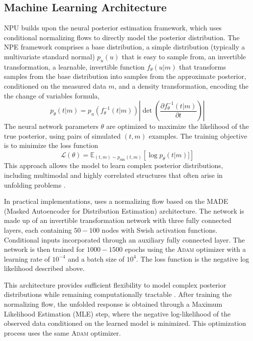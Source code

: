\subsection{Machine Learning Architecture}
    NPU builds upon the neural posterior estimation framework, which uses conditional normalizing flows to directly model the posterior distribution.
    The NPE framework comprises a base distribution, a simple distribution (typically a multivariate standard normal) $p_u(u)$ that is easy to sample from,
    an invertible transformation, a learnable, invertible function $f_\theta(u|m)$ that transforms samples from the base distribution into samples from the approximate posterior, conditioned on the measured data $m$, and
    a density transformation, encoding the the change of variables formula,
    \[
        p_\theta(t|m) = p_u(f_\theta^{-1}(t|m)) \left|\det\left(\frac{\partial f_\theta^{-1}(t|m)}{\partial t}\right)\right|
    \]
    The neural network parameters $\theta$ are optimized to maximize the likelihood of the true posterior, using pairs of simulated $(t, m)$ examples.
    The training objective is to minimize the loss function
    \[
        \mathcal{L}(\theta) = \mathbb{E}_{(t,m) \sim p_{\text{sim}}(t,m)} \left[ \log p_\theta(t|m)]\right]
    \]
    This approach allows the model to learn complex posterior distributions, including multimodal and highly correlated structures that often arise in unfolding problems .

    In practical implementations, uses a normalizing flow based on the MADE (Masked Autoencoder for Distribution Estimation) architecture.
    The network is made up of an invertible transformation network with three fully connected layers, each containing \(50-100\) nodes with Swish activation functions.
    Conditional inputs incorporated through an auxiliary fully connected layer.
    The network is then trained for \(1000-1500\) epochs using the \textsc{Adam} optimizer with a learning rate of \(10^{-4}\) and a batch size of \(10^4\).
    The loss function is the negative log likelihood described above.
    
    This architecture provides sufficient flexibility to model complex posterior distributions while remaining computationally tractable .
    After training the normalizing flow, the unfolded response is obtained through a Maximum Likelihood Estimation (MLE) step, where the negative log-likelihood of the observed data conditioned on the learned model is minimized.
    This optimization process uses the same \textsc{Adam} optimizer.
